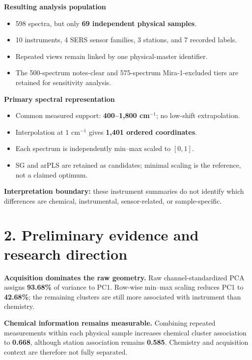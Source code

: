 \documentclass[10pt]{article}
\newcommand{\sectionbar}[1]{\vspace{2pt}{\color{briefblue}\rule{\linewidth}{0.8pt}}\vspace{-7pt}\section*{\color{briefblue}#1}\vspace{-5pt}}
\begin{document}
\begin{minipage}[t]{.485\linewidth}
\textbf{Resulting analysis population}
\begin{itemize}
\item 598 spectra, but only \textbf{69 independent physical samples}.
\item 10 instruments, 4 SERS sensor families, 3 stations, and 7 recorded labels.
\item Repeated views remain linked by one physical-master identifier.
\item The 500-spectrum notes-clear and 575-spectrum Mira-1-excluded tiers are retained for sensitivity analysis.
\end{itemize}
\end{minipage}\hfill
\begin{minipage}[t]{.495\linewidth}
\textbf{Primary spectral representation}
\begin{itemize}
\item Common measured support: \textbf{400--1,800 cm$^{-1}$}; no low-shift extrapolation.
\item Interpolation at 1 cm$^{-1}$ gives \textbf{1,401 ordered coordinates}.
\item Each spectrum is independently min--max scaled to $[0,1]$.
\item SG and arPLS are retained as candidates; minimal scaling is the reference, not a claimed optimum.
\end{itemize}
\end{minipage}

\begin{center}
\resizebox{.84\linewidth}{!}{}
\end{center}
\vfill
{\scriptsize\color{briefgray}\textbf{Interpretation boundary:} these instrument summaries do not identify which differences are chemical, instrumental, sensor-related, or sample-specific.}

\newpage
\sectionbar{2. Preliminary evidence and research direction}
\begin{minipage}[t]{.47\linewidth}
\textbf{Acquisition dominates the raw geometry.} Raw channel-standardized PCA assigns \textbf{93.68\%} of variance to PC1. Row-wise min--max scaling reduces PC1 to \textbf{42.68\%}; the remaining clusters are still more associated with instrument than chemistry.
\end{minipage}\hfill
\begin{minipage}[t]{.51\linewidth}
\textbf{Chemical information remains measurable.} Combining repeated measurements within each physical sample increases chemical cluster association to \textbf{0.668}, although station association remains \textbf{0.585}. Chemistry and acquisition context are therefore not fully separated.
\end{minipage}
\end{document}
